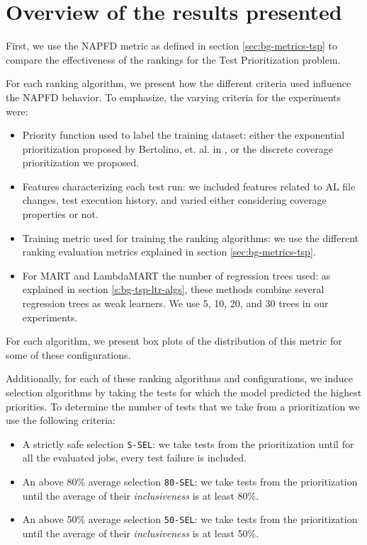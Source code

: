 \section{Overview of the results presented}
First, we use the NAPFD metric as defined in section \ref{sec:bg-metrics-tsp} to compare the effectiveness of the 
rankings for the Test Prioritization problem.

For each ranking algorithm, we present how the different criteria used influence the
NAPFD behavior. To emphasize, the varying criteria for the experiments were:
\begin{itemize}
    \item Priority function used to label the training dataset: either the exponential prioritization proposed by Bertolino, et. al. in \cite{Bertolino2020LearningtoRankVR}, or the discrete coverage prioritization we proposed.
    \item Features characterizing each test run: we included features related to AL file changes, test execution history, and varied either considering coverage properties or not.
    \item Training metric used for training the ranking algorithms: we use the different ranking evaluation metrics explained in section \ref{sec:bg-metrics-tsp}.
    \item For MART and LambdaMART the number of regression trees used: as explained in section \ref{s:bg-tsp-ltr-algs}, these methods combine several regression trees as weak learners. We use 5, 10, 20, and 30 trees in our experiments.
\end{itemize}

For each algorithm, we present box plots of the distribution of this metric for some of these configurations. 

Additionally, for each of these ranking algorithms and configurations, we induce selection algorithms by taking the tests
for which the model predicted the highest priorities. To determine the number of tests that we take
from a prioritization we use the following criteria:

\begin{itemize}
    \item A strictly safe selection \texttt{S-SEL}: we take tests from the prioritization until for all the evaluated jobs, every test failure is included.
    \item An above 80\% average selection \texttt{80-SEL}: we take tests from the prioritization until the average of their \emph{inclusiveness} is at least 80\%.
    \item An above 50\% average selection \texttt{50-SEL}: we take tests from the prioritization until the average of their \emph{inclusiveness} is at least 50\%.
\end{itemize}

